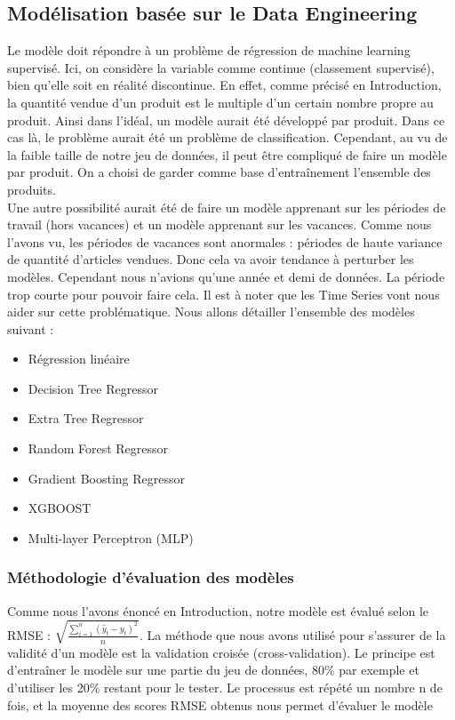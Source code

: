 \documentclass{article} %
\begin{document}
\subsection{Modélisation basée sur le Data Engineering}
Le modèle doit répondre à un problème de régression de machine learning supervisé. Ici, on considère la variable comme continue (classement supervisé), bien qu'elle soit en réalité discontinue. En effet, comme précisé en Introduction, la quantité vendue d'un produit est le multiple d'un certain nombre propre au produit. Ainsi dans l'idéal, un modèle aurait été développé par produit. Dans ce cas là, le problème aurait été un problème de classification. Cependant, au vu de la faible taille de notre jeu de données, il peut être compliqué de faire un modèle par produit. On a choisi de garder comme base d'entraînement l'ensemble des produits.\\
Une autre possibilité aurait été de faire un modèle apprenant sur les périodes de travail (hors vacances) et un modèle apprenant sur les vacances. Comme nous l'avons vu, les périodes de vacances sont anormales : périodes de haute variance de quantité d'articles vendues. Donc cela va avoir tendance à perturber les modèles. Cependant nous n'avions qu'une année et demi de données. La période trop courte pour pouvoir faire cela. Il est à noter que les Time Series vont nous aider sur cette problématique. 
Nous allons détailler l'ensemble des modèles suivant :
\begin{itemize}
	\item Régression linéaire
	\item Decision Tree Regressor
	\item Extra Tree Regressor
	\item Random Forest Regressor
	\item Gradient Boosting Regressor
	\item XGBOOST
	\item Multi-layer Perceptron (MLP)
\end{itemize}

\subsubsection{Méthodologie d'évaluation des modèles}
Comme nous l'avons énoncé en Introduction, notre modèle est évalué selon le RMSE : 
$\sqrt{\frac{\sum_{i=1}^{n}(\hat{y}_t-y_t)^2}{n}}$. La méthode que nous avons utilisé pour s'assurer de la validité d'un modèle est la validation croisée (cross-validation). Le principe est d'entraîner le modèle sur une partie du jeu de données, 80\% par exemple et d'utiliser les 20\% restant pour le tester. Le processus est répété un nombre n de fois, et la moyenne des scores RMSE obtenus nous permet d'évaluer le modèle
\end{document}
